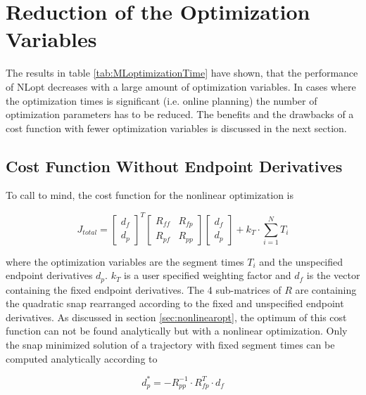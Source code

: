 \section{Reduction of the Optimization Variables}

The results in table \ref{tab:MLoptimizationTime} have shown, that the performance of NLopt decreases with a large amount of optimization variables. In cases where the optimization times is significant (i.e. online planning) the number of optimization parameters has to be reduced. The benefits and the drawbacks of a cost function with fewer optimization variables is discussed in the next section. \newpage

\subsection{Cost Function Without Endpoint Derivatives}

To call to mind, the cost function for the nonlinear optimization is 

\begin{equation}
J_{total} =
\begin{bmatrix}
   d_f \\
  d_p
\end{bmatrix}^T
\begin{bmatrix}
   R_{ff} & R_{fp} \\
  R_{pf} & R_{pp}
\end{bmatrix}
\begin{bmatrix}
   d_f \\
  d_p
\end{bmatrix}
+ k_T \cdot \sum_{i=1}^N T_i
\label{equ:total_cost_Result}
\end{equation}

where the optimization variables are the segment times $T_i$ and the unspecified endpoint derivatives $d_p$. $k_T$ is a user specified weighting factor and $d_f$ is the vector containing the fixed endpoint derivatives. The 4 sub-matrices of $R$ are containing the quadratic snap rearranged according to the fixed and unspecified endpoint derivatives. \newline
As discussed in section \ref{sec:nonlinearopt}, the optimum of this cost function can not be found analytically but with a nonlinear optimization. Only the snap minimized solution of a trajectory with fixed segment times can be computed analytically according to 



\begin{equation}
d_p^* = - R_{pp}^{-1} \cdot R_{fp}^T \cdot d_f
\label{equ:dpstar_Result}
\end{equation}

